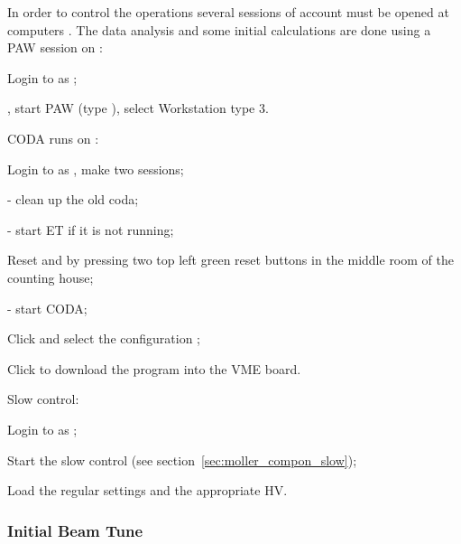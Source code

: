 {In order to control the operations several sessions
of  account must be opened at computers .
The data analysis and some initial calculations are done using a PAW\cite{PAWwww}
session on  :
 \begin{list}{--}{\setlength{\itemsep}{-0.15cm}}
   \item Login to  as ;
   \item {}, start PAW (type ), select Workstation type 3.  
 \end{list}
\noindent
CODA runs on : 
 \begin{list}{--}{\setlength{\itemsep}{-0.15cm}}
   \item Login to  as , make two sessions;
   \item {} - clean up the old coda;
   \item {} - start ET if it is not running;
   \item Reset  and  by pressing two top left green
         reset buttons in the middle room of the counting house;
   \item {} - start CODA;
   \item Click  and select the configuration ;
   \item Click  to download the program into the VME board.
 \end{list}

\noindent
Slow control:
 \begin{list}{--}{\setlength{\itemsep}{-0.15cm}}
   \item Login to  as ;
   \item Start the slow control (see section~\ref{sec:moller_compon_slow});
   \item Load the regular settings and the appropriate HV.
 \end{list}

\subsubsection {Initial Beam Tune}
\label{sec:moller_oper_initbeam}

}
